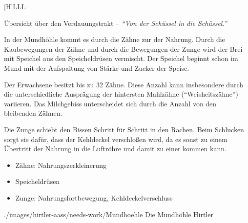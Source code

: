 {\begin{tabulary}{\linewidth}[H]{LLL}
\\\addlinespace\bottomrule
\end{tabulary}}
{Übersicht über den Verdauungstrakt --
\emph{\protect\enquote{Von der Schüssel in die Schüssel.}}\label{tab:verdauungstrakt-uebersicht}}
{}


\clearpage %

{%
In der Mundhöhle kommt es durch die Zähne zur
 der Nahrung. Durch die Kaubewegungen der
Zähne und durch die Bewegungen der Zunge wird der Brei mit
Speichel aus den Speicheldrüsen vermischt.
 Der Speichel beginnt schon im
Mund mit der Aufspaltung von Stärke und Zucker der Speise.

Der Erwachsene besitzt bis zu 32 Zähne.
 Diese Anzahl kann insbesondere
durch die unterschiedliche Ausprägung der hintersten
Mahlzähne (\protect\enquote{Weisheitszähne}) variieren. Das
Milchgebiss unterscheidet sich durch die Anzahl
 von den bleibenden Zähnen.

Die Zunge schiebt den Bissen Schritt für Schritt in den
Rachen. Beim Schlucken sorgt sie dafür, dass der Kehldeckel
verschloßen wird, da es sonst zu einem Übertritt der Nahrung
in die Luftröhre und damit zu einer  kommen
kann. }
{
\begin{itemize}
    \item Zähne: Nahrungszerkleinerung
    \item Speicheldrüsen
    \item Zunge: Nahrungsfortbewegung, Kehldeckelverschluss
\end{itemize}
}
{./images/hirtler-aass/needs-work/Mundhoehle}
{Die Mundhöhle}
{Hirtler}

